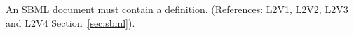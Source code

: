An SBML document must contain a \Model definition.  (References:
L2V1, L2V2, L2V3 and L2V4 Section~\ref{sec:sbml}).
